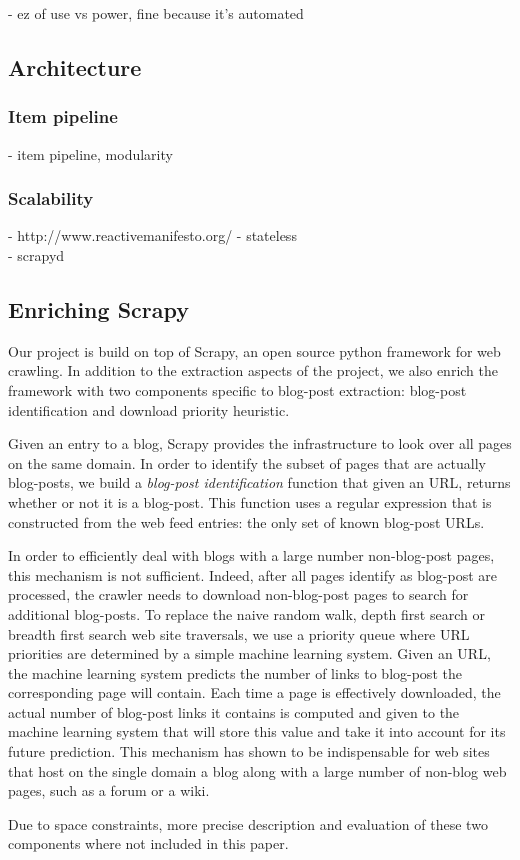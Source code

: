 - ez of use vs power, fine because it's automated

\subsection{Architecture}
\subsubsection{Item pipeline}
- item pipeline, modularity \\

\subsubsection{Scalability}
- http://www.reactivemanifesto.org/
- stateless \\
- scrapyd \\


\subsection{Enriching Scrapy}
Our project is build on top of Scrapy, an open source python framework for web crawling. In addition to the extraction aspects of the project, we also enrich the framework with two components specific to blog-post extraction: blog-post identification and download priority heuristic.

Given an entry to a blog, Scrapy provides the infrastructure to look over all pages on the same domain. In order to identify the subset of pages that are actually blog-posts, we build a \emph{blog-post identification} function that given an URL, returns whether or not it is a blog-post. This function uses a regular expression that is constructed from the web feed entries: the only set of known blog-post URLs.

In order to efficiently deal with blogs with a large number non-blog-post pages, this mechanism is not sufficient. Indeed, after all pages identify as blog-post are processed, the crawler needs to download non-blog-post pages to search for additional blog-posts. To replace the naive random walk, depth first search or breadth first search web site traversals, we use a priority queue where URL priorities are determined by a simple machine learning system. Given an URL, the machine learning system predicts the number of links to blog-post the corresponding page will contain. Each time a page is effectively downloaded, the actual number of blog-post links it contains is computed and given to the machine learning system that will store this value and take it into account for its future prediction. This mechanism has shown to be indispensable for web sites that host on the single domain a blog along with a large number of non-blog web pages, such as a forum or a wiki.

Due to space constraints, more precise description and evaluation of these two components where not included in this paper.
